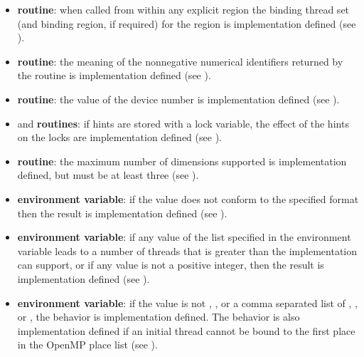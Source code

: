 \begin{itemize}
\item {} \textbf{routine}: when called from within any explicit 
 region the binding thread set (and binding region, if required) for the 
 region is implementation defined (see 
).

\item {} \textbf{routine}: the meaning of the 
nonnegative numerical identifiers returned by the 
 routine is implementation defined (see 
).

\item {} \textbf{routine}: the value of
  the device number is implementation defined (see ).

\item {} and  \textbf{routines}: 
if hints are stored with a lock variable, the effect of the hints on the locks are implementation defined (see ).

\item {} \textbf{routine}: 
  the maximum number of dimensions supported is implementation defined, but
  must be at least three (see ).

\item {} \textbf{environment variable}: if the value does not 
conform to the specified format then the result is implementation defined (see 
).

\item {} \textbf{environment variable}: if any value of the list specified in the 
 environment variable leads to a number of threads that is 
greater than the implementation can support, or if any value is not a positive integer, 
then the result is implementation defined (see ).

\item {} \textbf{environment variable}: if the value is not , , or a 
comma separated list of , , or , the behavior is 
implementation defined. The behavior is also implementation defined if an initial 
thread cannot be bound to the first place in the OpenMP place list (see 
).


\end{itemize}
